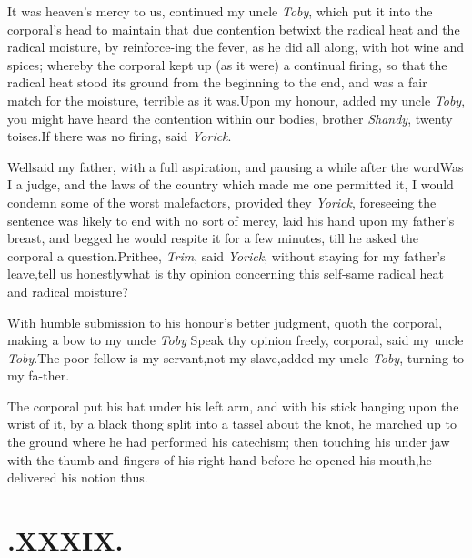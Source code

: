 \documentclass{article}
\begin{document}
\tsh  It was heaven’s mercy to us, continued my
uncle \textit{Toby}, which put it into the corporal’s head to
maintain that due contention betwixt the radical heat and the
radical moisture, by reinforce-\break ing the fever, as he did all along,
with hot wine and spices; whereby the corporal kept up (as it were)
a continual firing, so that the radical heat stood its ground from
the beginning to the end, and was a fair match for the moisture,
terrible as it was.\tsh Upon my honour, added my uncle
\textit{Toby}, you might have heard the contention within our bodies,
brother \textit{Shandy}, twenty toises.\tsk If there was no firing,
said \textit{Yorick}.

Well\tsk said my father, with a full aspiration, and pausing a while after
the word\tsh Was I a judge, and the laws\break
of the country which made me one\break
permitted it, I would condemn some of\break
the worst malefactors, provided they
\break
\tsh \textit{Yorick}, foreseeing the sentence was likely to end
with no sort of mercy, laid his hand upon my father’s breast,
and begged he would respite it for a few minutes, till he asked
the corporal a question.\tsh Prithee, \textit{Trim}, said
\textit{Yorick}, without staying for my father’s
leave,\tsk\break tell
us honestly\tsk what is thy opinion\break
concerning this self-same radical heat\break
and radical moisture?

With humble submission to his ho\-nour’s better judgment,
quoth the cor\-poral, making a bow to my uncle \textit{Toby}\break
\tsk Speak thy opinion freely, corporal,\break 
said my uncle \textit{Toby}.\tsk The poor fellow\break
is my servant,\tsk not my slave,\tsk added\break
my uncle \textit{Toby}, turning to my fa-\break ther.\tsh{}

The corporal put his hat under his\break
left arm, and with his stick hanging\break
upon the wrist of it, by a black thong\break
split into a tassel about the knot,\break
he marched up to the ground where he\break
had performed his catechism; then\break
touching his under jaw with the thumb\break
and fingers of his right hand before he\break
opened his mouth,\tsh he delivered his\break
notion thus.


\section{.\enspace  XXXIX.}

\baselineskip
\end{document}
